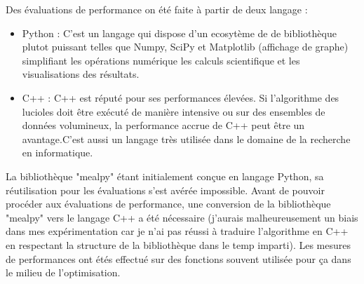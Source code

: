 \documentclass[conference]{IEEEtran}
\begin{document}
Des évaluations de performance on été faite à partir de deux langage :
\begin{itemize}
    \item Python : C'est un langage qui dispose d'un ecosytème de de bibliothèque plutot puissant telles que Numpy, SciPy et Matplotlib (affichage de graphe) simplifiant les opérations numérique les calculs scientifique et les visualisations des résultats. 
    \item C++ :  C++ est réputé pour ses performances élevées. Si  l'algorithme des lucioles doit être exécuté de manière intensive ou sur des ensembles de données volumineux, la performance accrue de C++ peut être un avantage.C'est aussi un langage très utilisée dans le domaine de la recherche en informatique. 
\end{itemize}
La bibliothèque "mealpy" étant initialement conçue en langage Python, sa réutilisation pour les évaluations s'est avérée impossible. Avant de pouvoir procéder aux évaluations de performance, une conversion de la bibliothèque "mealpy" vers le langage C++ a été nécessaire (j'aurais malheureusement un biais dans mes expérimentation car je n'ai pas réussi à traduire l'algorithme en C++ en respectant la structure de la bibliothèque dans le temp imparti). Les mesures de performances ont étés effectué sur des fonctions souvent utilisée pour ça dans le milieu de l'optimisation. 
\end{document}
